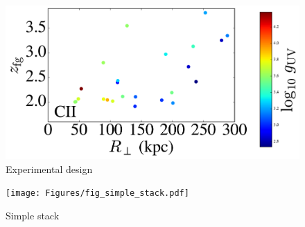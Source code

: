 \documentclass[12pt,preprint]{aastex}
\begin{document}



%


%



\clearpage

\begin{figure}
\includegraphics[width=5in]{Figures/fig_experiment.pdf}
\caption{Experimental design
}
\label{fig:exp}
\end{figure}

\begin{figure}
\texttt{[image: Figures/fig\_simple\_stack.pdf]}
\caption{Simple stack
}
\label{fig:stack}
\end{figure}
\end{document}
